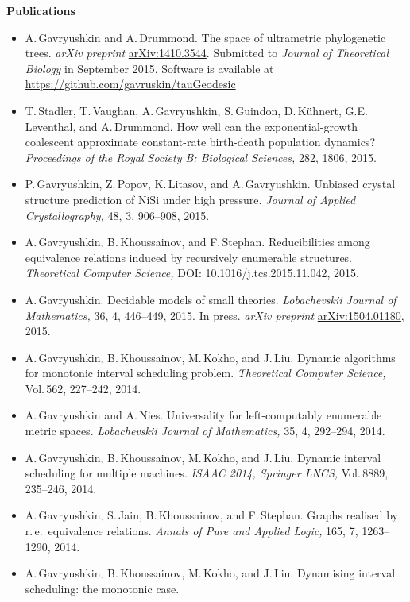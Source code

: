 \documentclass[12pt]{article}
\begin{document}
\centerline{\bf Publications}
\begin{itemize}
\item A.\,Gavryushkin and A.\,Drummond.
	The space of ultrametric phylogenetic trees.
	{\em arXiv preprint} \href{http://arxiv.org/abs/1410.3544}{arXiv:1410.3544}.
	Submitted to {\em Journal of Theoretical Biology} in September 2015.
	Software is available at
	\href{https://github.com/gavruskin/tauGeodesic}{https://github.com/gavruskin/tauGeodesic}
\item T.\,Stadler, T.\,Vaughan, A.\,Gavryushkin, S.\,Guindon, D.\,K\"uhnert, G.E.\,Leventhal, and A.\,Drummond.
	How well can the exponential-growth coalescent approximate constant-rate birth-death population dynamics?
	{\em Proceedings of the Royal Society B: Biological Sciences,} 282, 1806, 2015.
\item P.\,Gavryushkin, Z.\,Popov, K.\,Litasov, and A.\,Gavryushkin.
	Unbiased crystal structure prediction of $\mathrm{NiSi}$ under high pressure.
	{\em Journal of Applied Crystallography,} 48, 3, 906--908, 2015.
\item A.\,Gavryushkin, B.\,Khoussainov, and F.\,Stephan.
	Reducibilities among equivalence relations induced by recursively enumerable structures.
	{\em Theoretical Computer Science,} DOI: 10.1016/j.tcs.2015.11.042, 2015.
\item A.\,Gavryushkin.
	Decidable models of small theories.
	{\em Lobachevskii Journal of Mathematics,} 36, 4, 446--449, 2015.
	In press.
	{\em arXiv preprint} \href{http://arxiv.org/abs/1504.01180}{arXiv:1504.01180}, 2015.
\item A.\,Gavryushkin, B.\,Khoussainov, M.\,Kokho, and J.\,Liu.
	Dynamic algorithms for monotonic interval scheduling problem.
	{\em Theoretical Computer Science,} Vol.\,562, 227--242, 2014.
\item A.\,Gavryushkin and A.\,Nies.
	Universality for left-computably enumerable  metric spaces.
	{\em Lobachevskii Journal of Mathematics,} 35, 4, 292--294, 2014.
\item A.\,Gavryushkin, B.\,Khoussainov, M.\,Kokho, and J.\,Liu.
	Dynamic interval scheduling for multiple machines.
	{\em ISAAC 2014, Springer LNCS,} Vol.\,8889, 235--246, 2014.
\item A.\,Gavryushkin, S.\,Jain, B.\,Khoussainov, and F.\,Stephan.
	Graphs realised by r.\,e.\ equivalence relations.
	{\em Annals of Pure and Applied Logic,} 165, 7, 1263--1290, 2014.
\item A.\,Gavryushkin, B.\,Khoussainov, M.\,Kokho, and J.\,Liu.
	Dynamising interval scheduling: the monotonic case.

\end{itemize}
\end{document}
